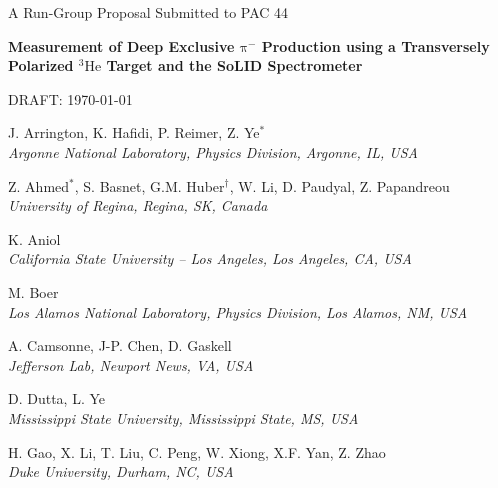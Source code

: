 \documentclass{article}
\begin{document}

\begin{center}

{\Huge A Run-Group Proposal Submitted to PAC 44}

\vspace*{25pt}

{\LARGE\bf
Measurement of Deep Exclusive $\mathrm\pi^-$ Production
using a Transversely Polarized $\mathrm{^{3}He}$ Target
and the SoLID Spectrometer}

\vspace*{2ex}
DRAFT: \today

\vspace*{25pt}

J. Arrington, K. Hafidi, P. Reimer, Z. Ye$^\ast$ \\
{\it Argonne National Laboratory, Physics Division, Argonne, IL, USA}
\vspace*{10pt}

Z. Ahmed$^\ast$, S. Basnet, G.M. Huber$^\dagger$, W. Li, D. Paudyal, Z. Papandreou\\
{\it University of Regina, Regina, SK, Canada}
\vspace*{20pt}

K. Aniol\\
{\it California State University -- Los Angeles, Los Angeles, CA, USA}
\vspace*{10pt}

M. Boer\\
{\it Los Alamos National Laboratory, Physics Division, Los Alamos, NM, USA}
\vspace*{10pt}

A. Camsonne,  J-P. Chen, D. Gaskell\\
{\it  Jefferson Lab, Newport News, VA, USA}
\vspace*{10pt}

D. Dutta, L. Ye\\
{\it Mississippi State University, Mississippi State, MS, USA}
\vspace*{10pt}

H. Gao, X. Li, T. Liu, C. Peng, W. Xiong, X.F. Yan, Z. Zhao\\
{\it Duke University, Durham, NC, USA}
\vspace*{10pt}


\end{center}
\end{document}
